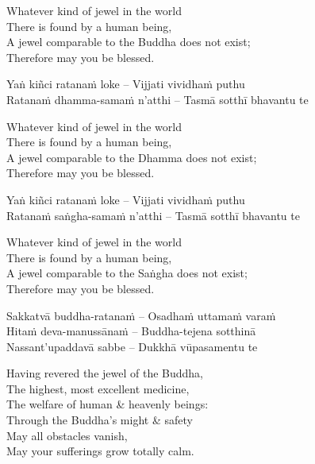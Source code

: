 \begin{english-verses}
  Whatever kind of jewel in the world\\
  There is found by a human being,\\
  A jewel comparable to the Buddha does not exist;\\
  Therefore may you be blessed.
\end{english-verses}

Yaṅ kiñci ratanaṁ loke – Vijjati vividhaṁ puthu\\
Ratanaṁ dhamma-samaṁ n'atthi – Tasmā sotthī bhavantu te

\begin{english-verses}
  Whatever kind of jewel in the world\\
  There is found by a human being,\\
  A jewel comparable to the Dhamma does not exist;\\
  Therefore may you be blessed.
\end{english-verses}

Yaṅ kiñci ratanaṁ loke – Vijjati vividhaṁ puthu\\
Ratanaṁ saṅgha-samaṁ n'atthi – Tasmā sotthī bhavantu te

\begin{english-verses}
  Whatever kind of jewel in the world\\
  There is found by a human being,\\
  A jewel comparable to the Saṅgha does not exist;\\
  Therefore may you be blessed.
\end{english-verses}

Sakkatvā buddha-ratanaṁ – Osadhaṁ
uttamaṁ varaṁ\\
Hitaṁ deva-manussānaṁ – Buddha-tejena sotthinā\\
Nassant'upaddavā sabbe – Dukkhā vūpasamentu te

\begin{english-verses}
  Having revered the jewel of the Buddha,\\
  The highest, most excellent medicine,\\
  The welfare of human \& heavenly beings:\\
  Through the Buddha's might \& safety\\
  May all obstacles vanish,\\
  May your sufferings grow totally calm.
\end{english-verses}

